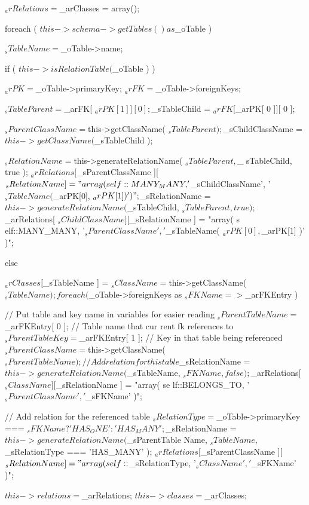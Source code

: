 \begin{DoxyCode}
    {
        $_arRelations = $_arClasses = array();
        
        foreach ( $this->schema->getTables() as $_oTable )
        {
            $_sTableName = $_oTable->name;

            if ( $this->isRelationTable( $_oTable ) )
            {
                $_arPK = $_oTable->primaryKey;
                $_arFK = $_oTable->foreignKeys;

                $_sTableParent = $_arFK[ $_arPK[ 1 ]][ 0 ];
                $_sTableChild = $_arFK[ $_arPK[ 0 ]][ 0 ];
                
                $_sParentClassName = $this->getClassName( $_sTableParent );
                $_sChildClassName = $this->getClassName( $_sTableChild );

                $_sRelationName = $this->generateRelationName( $_sTableParent, $_
      sTableChild, true );
                $_arRelations[ $_sParentClassName ][ $_sRelationName ] = "array( 
      self::MANY_MANY, '$_sChildClassName', '$_sTableName( $_arPK[0], $_arPK[1] )' )";

                $_sRelationName  =$this->generateRelationName( $_sTableChild, $_s
      TableParent, true );
                $_arRelations[ $_sChildClassName ][ $_sRelationName ] = "array( s
      elf::MANY_MANY, '$_sParentClassName', '$_sTableName( $_arPK[0], $_arPK[1] )' )";
            }
            else
            {
                $_arClasses[ $_sTableName ] = $_sClassName = $this->getClassName(
       $_sTableName );
                
                foreach ( $_oTable->foreignKeys as $_sFKName => $_arFKEntry )
                {
                    //  Put table and key name in variables for easier reading
                    $_sParentTableName = $_arFKEntry[ 0 ]; // Table name that cur
      rent fk references to
                    $_sParentTableKey = $_arFKEntry[ 1 ];   // Key in that table 
      being referenced
                    $_sParentClassName = $this->getClassName( $_sParentTableName 
      );

                    //  Add relation for this table
                    $_sRelationName = $this->generateRelationName( $_sTableName, 
      $_sFKName, false );
                    $_arRelations[ $_sClassName ][ $_sRelationName ] = "array( se
      lf::BELONGS_TO, '$_sParentClassName', '$_sFKName' )";

                    //  Add relation for the referenced table
                    $_sRelationType = $_oTable->primaryKey === $_sFKName ? 'HAS_O
      NE' : 'HAS_MANY';
                    $_sRelationName = $this->generateRelationName( $_sParentTable
      Name, $_sTableName, $_sRelationType === 'HAS_MANY' );
                    $_arRelations[ $_sParentClassName ][ $_sRelationName ] = "arr
      ay( self::$_sRelationType, '$_sClassName', '$_sFKName' )";
                }
            }
        }
        
        $this->relations = $_arRelations;
        $this->classes = $_arClasses;
    }
\end{DoxyCode}




